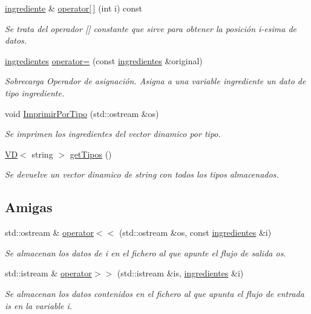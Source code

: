 \begin{DoxyCompactItemize}
\hyperlink{classingrediente}{ingrediente} \& \hyperlink{classingredientes_a58214e1464cd16342bfb6f756befa9c6}{operator\mbox{[}$\,$\mbox{]}} (int i) const
\begin{DoxyCompactList}\small\item\em Se trata del operador \mbox{[}\mbox{]} constante que sirve para obtener la posición i-\/esima de datos. \end{DoxyCompactList}\item 
\hyperlink{classingredientes}{ingredientes} \hyperlink{classingredientes_aeb1b9830ed35d73ec057e7037312b695}{operator=} (const \hyperlink{classingredientes}{ingredientes} \&original)
\begin{DoxyCompactList}\small\item\em Sobrecarga Operador de asignación. Asigna a una variable ingrediente un dato de tipo ingrediente. \end{DoxyCompactList}\item 
void \hyperlink{classingredientes_a29b978d5b42dea79bdd85f366ebbe70f}{Imprimir\+Por\+Tipo} (std\+::ostream \&os)
\begin{DoxyCompactList}\small\item\em Se imprimen los ingredientes del vector dinamico por tipo. \end{DoxyCompactList}\item 
\mbox{\label{classingredientes_a0404324a62539f06a97498169b879005}} 
\hyperlink{classVD}{VD}$<$ string $>$ \hyperlink{classingredientes_a0404324a62539f06a97498169b879005}{get\+Tipos} ()
\begin{DoxyCompactList}\small\item\em Se devuelve un vector dinamico de string con todos los tipos almacenados. \end{DoxyCompactList}\end{DoxyCompactItemize}
\subsection*{Amigas}
\begin{DoxyCompactItemize}
\item 
std\+::ostream \& \hyperlink{classingredientes_adaef6ec124faaf2beac1cadefa45e783}{operator$<$$<$} (std\+::ostream \&os, const \hyperlink{classingredientes}{ingredientes} \&i)
\begin{DoxyCompactList}\small\item\em Se almacenan los datos de i en el fichero al que apunte el flujo de salida os. \end{DoxyCompactList}\item 
std\+::istream \& \hyperlink{classingredientes_abbcb1255e417a8a8b4a9fd4ca0ad4ee6}{operator$>$$>$} (std\+::istream \&is, \hyperlink{classingredientes}{ingredientes} \&i)
\begin{DoxyCompactList}\small\item\em Se almacenan los datos contenidos en el fichero al que apunta el flujo de entrada is en la variable i. \end{DoxyCompactList}\end{DoxyCompactItemize}


